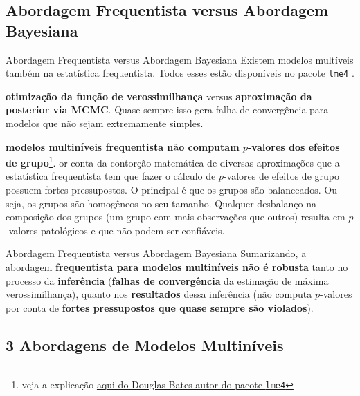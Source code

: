 \subsection{Abordagem Frequentista versus Abordagem Bayesiana}
\begin{frame}{Abordagem Frequentista versus Abordagem Bayesiana}
	Existem modelos multíveis também na estatística frequentista.
	Todos esses estão disponíveis no pacote \texttt{lme4} \parencite{lme4}.
	\begin{vfilleditems}
		\item \textbf{otimização da função de verossimilhança} versus \textbf{aproximação da posterior via MCMC}.
		Quase sempre isso gera falha de convergência para modelos que não sejam extremamente
		simples.
		\item \textbf{modelos multiníveis frequentista não computam $p$-valores dos efeitos de grupo}\footnote{veja a explicação \href{https://stat.ethz.ch/pipermail/r-help/2006-May/094765.html}{aqui do Douglas Bates autor do pacote \texttt{lme4}}}.
		or conta da contorção matemática de diversas aproximações que a estatística
		frequentista tem que fazer o cálculo de $p$-valores de efeitos de
		grupo possuem fortes pressupostos. O principal é que os grupos são balanceados.
		Ou seja, os grupos são homogêneos no seu tamanho.
		Qualquer desbalanço na composição dos grupos (um grupo com mais observações que outros) resulta em
		$p$-valores patológicos e que não podem ser confiáveis.
	\end{vfilleditems}
\end{frame}

\begin{frame}{Abordagem Frequentista versus Abordagem Bayesiana}
	Sumarizando, a abordagem \textbf{frequentista para modelos multiníveis não é robusta}
	tanto no processo da \textbf{inferência} (\textbf{falhas de convergência}
	da estimação de máxima verossimilhança), quanto nos \textbf{resultados} dessa
	inferência (não computa $p$-valores por conta de \textbf{fortes pressupostos
		que quase sempre são violados}).
\end{frame}

\subsection{3 Abordagens de Modelos Multiníveis}

